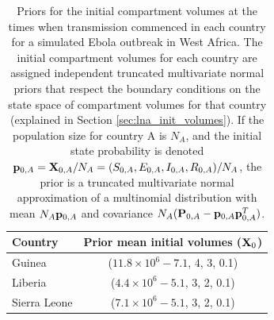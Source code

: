 \begin{table}[htbp]
	\caption[Priors for initial compartment volumes for a simulated Ebola outbreak in West Africa]{Priors for the initial compartment volumes at the times when transmission commenced in each country for a simulated Ebola outbreak in West Africa. The initial compartment volumes for each country are assigned independent truncated multivariate normal priors that respect the boundary conditions on the state space of compartment volumes for that country (explained in Section \ref{sec:lna_init_volumes}). If the population size for country A is $ N_A $, and the initial state probability is denoted $ \mathbf{p}_{0,A} = \mathbf{X}_{0,A}/N_A  = (S_{0,A}, E_{0,A}, I_{0,A}, R_{0,A})/N_A$, the prior is a truncated multivariate normal approximation of a multinomial distribution with mean $ N_A\mathbf{p}_{0,A}$ and covariance $ N_A(\mathbf{P}_{0,A} - \mathbf{p}_{0,A}\mathbf{p}_{0,A}^T) $.} 
	\label{tab:ebola_single_initdist_priors}
	\centering
	\begin{tabular}{lc}
		\hline \textbf{Country} & \textbf{Prior mean initial volumes} ($ \mathbf{X}_0 $) \\
		\hline
		Guinea & ($ 11.8\times10^6 -7.1$, 4, 3, 0.1) \\
		Liberia & ($ 4.4\times10^6 -5.1$, 3, 2, 0.1) \\
		Sierra Leone & ($ 7.1\times10^6 -5.1$, 3, 2, 0.1) \\
		\hline
	\end{tabular}
\end{table}

